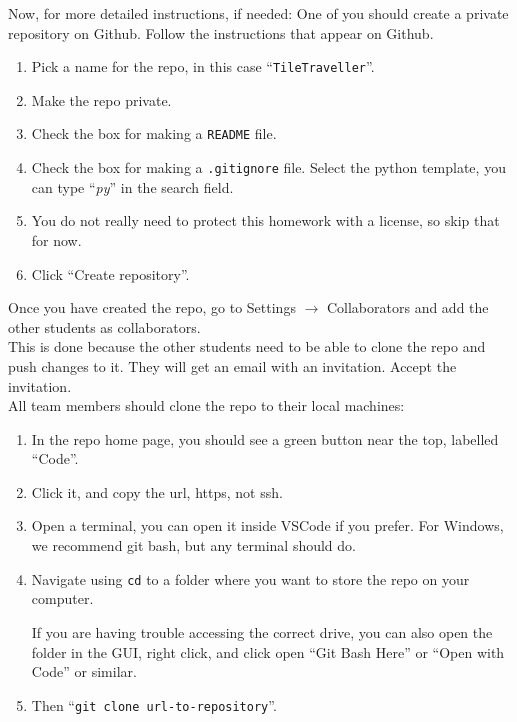 Now, for more detailed instructions, if needed:
One of you should create a private repository on Github.
Follow the instructions that appear on Github.
\begin{enumerate}
    \item Pick a name for the repo, in this case ``\texttt{TileTraveller}''.

    \item Make the repo private.

    \item Check the box for making a \texttt{README} file.

    \item
    Check the box for making a \texttt{.gitignore} file.
    Select the python template,
    you can type ``\emph{py}'' in the search field.

    \item
    You do not really need to protect this homework with a license,
    so skip that for now.

    \item Click ``Create repository''.
\end{enumerate}
Once you have created the repo, go to Settings $\rightarrow$ Collaborators and add the other students as collaborators.\\
This is done because the other students need to be able to clone the repo and push changes to it.
They will get an email with an invitation.
Accept the invitation.\\

All team members should clone the repo to their local machines:
\begin{enumerate}
    \item
    In the repo home page, you should see a green button near the top, labelled ``Code''. 

    \item
    Click it, and copy the url, https, not ssh.

    \item
    Open a terminal, you can open it inside VSCode if you prefer.
    For Windows, we recommend git bash, but any terminal should do.

    \item
    Navigate using \texttt{cd} to a folder where you want to store the repo on your computer.

    If you are having trouble accessing the correct drive,
    you can also open the folder in the GUI,
    right click, and click open ``Git Bash Here'' or ``Open with Code'' or similar.

    \item
    Then ``\texttt{git clone url-to-repository}''.
\end{enumerate}

